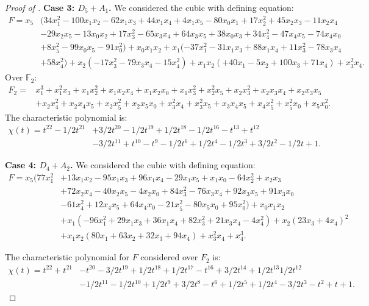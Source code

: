 \documentclass[12pt]{amsart}
\numberwithin{equation}{section}
\theoremstyle{plain}
\theoremstyle{remark}
\theoremstyle{definition}
\newcommand{\bF}{\mathbb{F}}
\begin{document}
\begin{proof}[Proof of ]
\noindent\textbf{Case 3: $D_5+A_1$.} We considered the cubic with defining equation:
\begin{equation}\label{ex: D5+A1}
\begin{split}
    F= x_5&(34x_1^2- 100x_1x_2- 62x_1x_3+ 44x_1x_4 + 4x_1x_5 - 80x_0x_1 + 17x_2^2+ 45x_2x_3- 11x_2x_4  \\
    &- 29x_2x_5- 13x_0x_2+ 17x_3^2 - 65x_3x_4 + 64x_3x_5 + 38x_0x_3 + 34x_4^2 - 47x_4x_5 - 74x_4x_0 \\
    &+ 8x_5^2 - 99x_0x_5 - 91x_0^2)+x_0x_1x_2+x_1(-37x_1^2- 31x_1x_3 + 88x_1x_4+ 11x_3^2 - 78x_3x_4 \\
    & + 58x_4^2)+x_2(- 17x_3^2 - 79x_3x_4  - 15x_4^2)+x_1x_2(+ 40x_1- 5x_2 + 100x_3 + 71x_4)  + x_3^2x_4. 
\end{split}
\end{equation}
Over $\bF_2:$
\begin{align*}
    F_2 = &x_1^3 + x_1^2x_3 + x_1x_2^2 + x_1x_2x_4 + x_1x_2x_0 + x_1x_3^2 + x_2^2x_5 + x_2x_3^2 + x_2x_3x_4 + x_2x_3x_5  \\
    &+ x_2x_4^2+ x_2x_4x_5 + x_2x_5^2 + x_2x_5x_0 + x_3^2x_4 + x_3^2x_5 + x_3x_4x_5 + x_4x_5^2 + x_5^2x_0 + x_5x_0^2.
\end{align*}
The characteristic polynomial is:
\begin{align*} 
\chi(t) = t^{22} - 1/2t^{21} &+ 3/2t^{20} - 1/2t^{19} + 1/2t^{18} - 1/2t^{16} - t^{13} + t^{12} \\
&- 3/2t^{11} + t^{10} - t^9 - 1/2t^6 + 1/2t^4 - 1/2t^3 + 3/2t^2 - 1/2t + 1.
\end{align*}

\noindent\textbf{Case 4: $D_4+A_2$.} We considered the cubic with defining equation:
\begin{equation}\label{ex: D4+A2}
\begin{split}
    F= x_5(77x_1^2&+ 13x_1x_2- 95x_1x_3+ 96x_1x_4 - 29x_1x_5 + x_1x_0 - 64x_2^2+ x_2x_3 \\
    &+ 72x_2x_4 - 40x_2x_5 - 4x_2x_0+ 84x_3^2 - 76x_3x_4 + 92x_3x_5 + 91x_3x_0\\
    &- 61x_4^2 + 12x_4x_5 + 64x_4x_0 - 21x_5^2 - 80x_5x_0 + 95x_0^2)+x_0x_1x_2\\
    &+x_1(-96x_1^2+ 29x_1x_3 + 36x_1x_4+82x_3^2 + 21x_3x_4  - 4x_4^2)+x_2(23x_3+4x_4)^2\\
    &+x_1x_2(80x_1+ 63x_2+ 32x_3 + 94x_4)+ x_3^2x_4  + x_4^3. \end{split}
\end{equation}

The characteristic polynomial for $F$ considered over $F_2$ is:
\begin{align*} 
\chi(t) = t^{22} + t^{21} &- t^{20} - 3/2t^{19} + 1/2t^{18} + 1/2t^{17} - t^{16} + 3/2t^{14} + 1/2t^{13} 1/2t^{12}\\
&- 1/2t^{11} - 1/2t^{10} + 1/2t^9 + 3/2t^8 - t^6 + 1/2t^5 + 1/2t^4 - 3/2t^3 - t^2 + t + 1.
\end{align*}


\end{proof}
\end{document}

